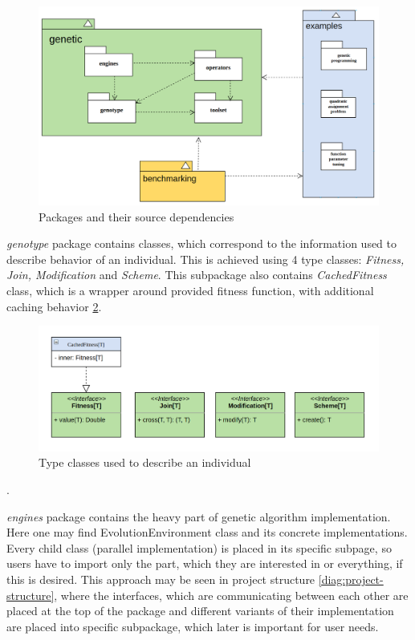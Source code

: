 \begin{figure}[h]
\centering\includegraphics[width=1.\textwidth]{img/diagrams/alleles-top-packages}
\caption{Packages and their source dependencies}\label{diag:packages}
\end{figure}

\textit{genotype} package contains classes, which correspond to the information used to describe behavior of an individual. This is achieved using 4 type classes: \textit{Fitness, Join, Modification} and \textit{Scheme}. This subpackage also contains \textit{CachedFitness} class, which is a wrapper around provided fitness function, with additional caching behavior \ref{diag:genotype-classes}. 

\begin{figure}[h]
\centering\includegraphics[width=1.\textwidth]{img/diagrams/alleles-genotype}
\caption{Type classes used to describe an individual}\label{diag:genotype-classes}
\end{figure}.

\textit{engines} package contains the heavy part of genetic algorithm implementation. Here one may find EvolutionEnvironment class and its concrete implementations. Every child class (parallel implementation) is placed in its specific subpage, so users have to import only the part, which they are interested in or everything, if this is desired. This approach may be seen in project structure \ref{diag:project-structure}, where the interfaces, which are communicating between each other are placed at the top of the package and different variants of their implementation are placed into specific subpackage, which later is important for user needs.

